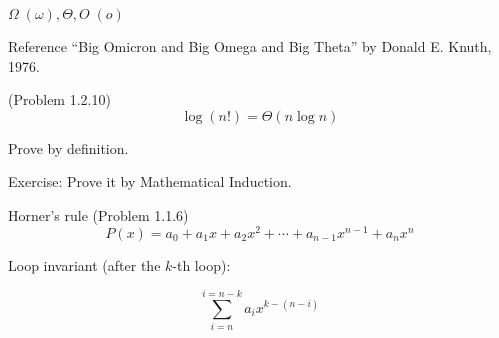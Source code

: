 \begin{frame}{$\Omega\;(\omega), \Theta, O\;(o)$}
  \begin{alertblock}{Reference}
	``Big Omicron and Big Omega and Big Theta'' by Donald E. Knuth, 1976.
  \end{alertblock}
\end{frame}
\begin{frame}{(Problem 1.2.10)}
  \[
	\log(n!) = \Theta(n \log n)
  \]

  \pause
  \vspace{0.30cm}
  \centerline{Prove by definition.}

  \pause
  \vspace{0.50cm}

  \centerline{Exercise: Prove it by Mathematical Induction.}
\end{frame}
\begin{frame}{Horner's rule (Problem 1.1.6)}
  \[
	P(x) = a_0 + a_1 x + a_2 x^2 + \cdots + a_{n-1} x^{n-1} + a_n x^n
  \]

  \pause
  \vspace{0.50cm}
  
  \centerline{Loop invariant (after the $k$-th loop):}

  \[
	 \sum_{i = n}^{i = n-k} a_i x^{k-(n-i)}
  \]
\end{frame}
